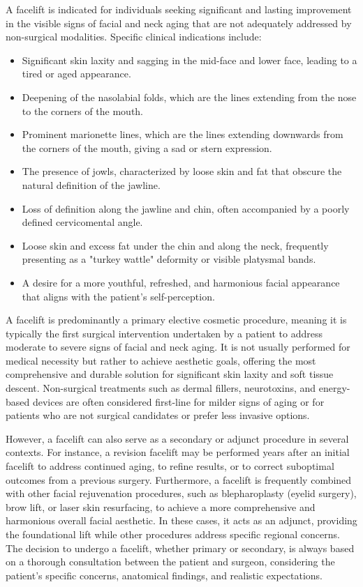A facelift is indicated for individuals seeking significant and lasting improvement in the visible signs of facial and neck aging that are not adequately addressed by non-surgical modalities. Specific clinical indications include:
\begin{itemize}
  \item Significant skin laxity and sagging in the mid-face and lower face, leading to a tired or aged appearance.
  \item Deepening of the nasolabial folds, which are the lines extending from the nose to the corners of the mouth.
  \item Prominent marionette lines, which are the lines extending downwards from the corners of the mouth, giving a sad or stern expression.
  \item The presence of jowls, characterized by loose skin and fat that obscure the natural definition of the jawline.
  \item Loss of definition along the jawline and chin, often accompanied by a poorly defined cervicomental angle.
  \item Loose skin and excess fat under the chin and along the neck, frequently presenting as a "turkey wattle" deformity or visible platysmal bands.
  \item A desire for a more youthful, refreshed, and harmonious facial appearance that aligns with the patient's self-perception.
\end{itemize}

A facelift is predominantly a primary elective cosmetic procedure, meaning it is typically the first surgical intervention undertaken by a patient to address moderate to severe signs of facial and neck aging. It is not usually performed for medical necessity but rather to achieve aesthetic goals, offering the most comprehensive and durable solution for significant skin laxity and soft tissue descent. Non-surgical treatments such as dermal fillers, neurotoxins, and energy-based devices are often considered first-line for milder signs of aging or for patients who are not surgical candidates or prefer less invasive options.

However, a facelift can also serve as a secondary or adjunct procedure in several contexts. For instance, a revision facelift may be performed years after an initial facelift to address continued aging, to refine results, or to correct suboptimal outcomes from a previous surgery. Furthermore, a facelift is frequently combined with other facial rejuvenation procedures, such as blepharoplasty (eyelid surgery), brow lift, or laser skin resurfacing, to achieve a more comprehensive and harmonious overall facial aesthetic. In these cases, it acts as an adjunct, providing the foundational lift while other procedures address specific regional concerns. The decision to undergo a facelift, whether primary or secondary, is always based on a thorough consultation between the patient and surgeon, considering the patient's specific concerns, anatomical findings, and realistic expectations.

